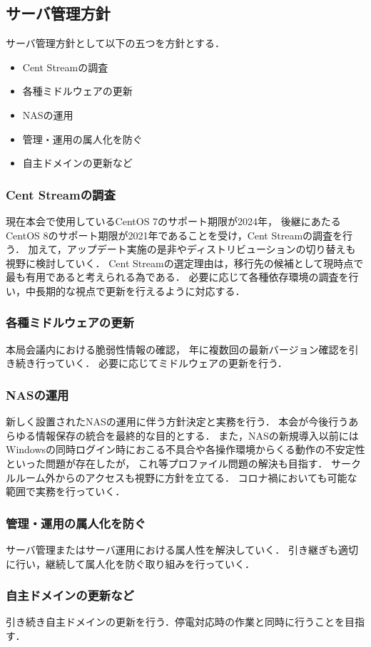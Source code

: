 \subsection*{サーバ管理方針}


サーバ管理方針として以下の五つを方針とする．
\begin{itemize}
    \item Cent Streamの調査
    \item 各種ミドルウェアの更新
    \item NASの運用
    \item 管理・運用の属人化を防ぐ
    \item 自主ドメインの更新など
\end{itemize}

\subsubsection*{Cent Streamの調査}
現在本会で使用しているCentOS 7のサポート期限が2024年，
後継にあたるCentOS 8のサポート期限が2021年であることを受け，Cent Streamの調査を行う．
加えて，アップデート実施の是非やディストリビューションの切り替えも視野に検討していく．
Cent Streamの選定理由は，移行先の候補として現時点で最も有用であると考えられる為である．
必要に応じて各種依存環境の調査を行い，中長期的な視点で更新を行えるように対応する．

\subsubsection*{各種ミドルウェアの更新}
本局会議内における脆弱性情報の確認，
年に複数回の最新バージョン確認を引き続き行っていく．
必要に応じてミドルウェアの更新を行う．

\subsubsection*{NASの運用}
新しく設置されたNASの運用に伴う方針決定と実務を行う．
本会が今後行うあらゆる情報保存の統合を最終的な目的とする．
また，NASの新規導入以前にはWindowsの同時ログイン時におこる不具合や各操作環境からくる動作の不安定性といった問題が存在したが，
これ等プロファイル問題の解決も目指す．
サークルルーム外からのアクセスも視野に方針を立てる．
コロナ禍においても可能な範囲で実務を行っていく．

\subsubsection*{管理・運用の属人化を防ぐ}
サーバ管理またはサーバ運用における属人性を解決していく．
引き継ぎも適切に行い，継続して属人化を防ぐ取り組みを行っていく．

\subsubsection*{自主ドメインの更新など}
引き続き自主ドメインの更新を行う．停電対応時の作業と同時に行うことを目指す．

